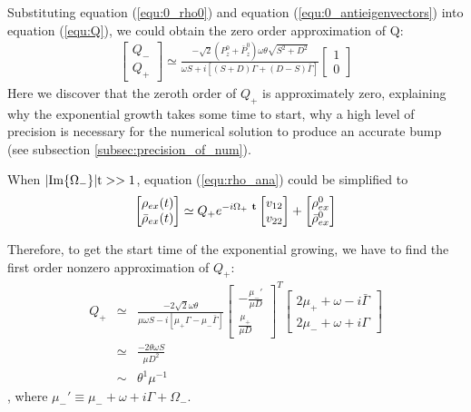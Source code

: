 \documentclass[aps,prd,twocolumn,amsmath,amssymb,groupedaddress]{revtex4-2}
\begin{document}
Substituting equation (\ref{equ:0_rho0}) and equation (\ref{equ:0_antieigenvectors}) into equation (\ref{equ:Q}), we could obtain the zero order approximation of Q:
\begin{eqnarray}
	\label{equ:0_Q}
	\begin{bmatrix}
		Q_- \\ Q_+
	\end{bmatrix} \simeq \frac{-\sqrt{2} \left(P_{z}^0 + \bar{P}_{z}^0\right)\omega \theta \sqrt{S^2+D^2}}{\omega S + i\left[(S+D) \Gamma + (D-S) \bar{\Gamma}\right]}
	\begin{bmatrix}
	1 \\ 0
	\end{bmatrix}
\end{eqnarray}
Here we discover that the zeroth order of $Q_+$ is approximately zero, explaining why the exponential growth takes some time to start,  why a high level of precision is necessary for the numerical solution to produce an accurate bump (see subsection \ref{subsec:precision_of_num}).

When $|\rm{Im}\{\Omega_-\}| t>>1$, equation (\ref{equ:rho_ana}) could be simplified to
\begin{eqnarray}
	\begin{bmatrix}
		\rho_{ex} (t)\\ \bar{\rho}_{ex} (t)
	\end{bmatrix}
	\simeq
	Q_+e^{-i \Omega_{+} ~\bf{t}}
	\begin{bmatrix}
		v_{12}  \\ v_{22}
	\end{bmatrix} + 
	\begin{bmatrix} 
		\rho^0_{ex} \\ \bar{\rho}^0_{ex}
	\end{bmatrix}
\end{eqnarray}

Therefore, to get the start time of the exponential growing, we have to find the first order nonzero approximation of $Q_+$:
\begin{eqnarray}
	\label{equ:Qp}
	Q_+	&\simeq&
	\frac{-2\sqrt{2}\omega \theta}{\mu \omega S - i \left[\mu_+ \Gamma - \mu_- \bar{\Gamma} \right]}
	\begin{bmatrix}
		-\frac{\mu_-'}{\mu D} \\ \frac{\mu_+}{\mu D}
	\end{bmatrix}^T
	\begin{bmatrix}
		2\mu_+ + \omega - i \bar{\Gamma} \\ 2\mu_- + \omega + i \Gamma
	\end{bmatrix} \nonumber \\
	&\simeq&
	\frac{-2 \theta\omega S}{\mu D^2}\\
	&\sim&
	\theta^1 \mu^{-1}
\end{eqnarray}, where $\mu_-' \equiv \mu_- + \omega + i \Gamma + \Omega_-$.
\end{document}
